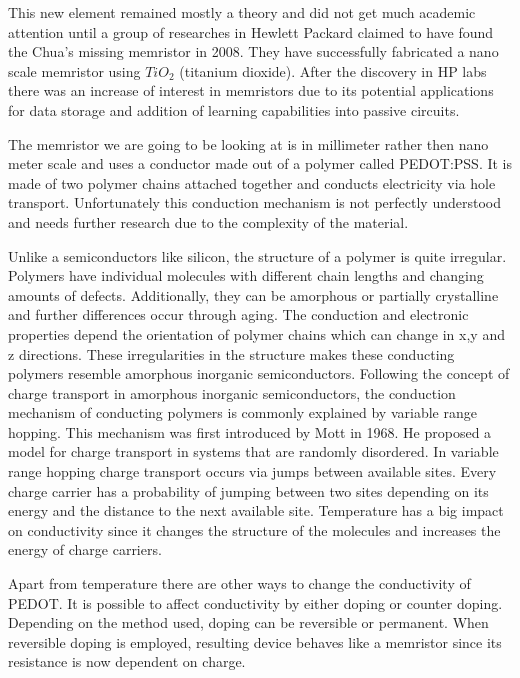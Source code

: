 This new element remained mostly a theory and did not get much academic attention until a group of researches in Hewlett Packard claimed to have found the Chua's missing memristor in 2008. They have successfully fabricated a nano scale memristor using $TiO_2$ (titanium dioxide). After the discovery in HP labs there was an increase of interest in memristors due to its potential applications for data storage and addition of learning capabilities into passive circuits. 

The memristor we are going to be looking at is in millimeter rather then nano meter scale and uses a conductor made out of a polymer called PEDOT:PSS. It is made of two polymer chains attached together and conducts electricity via hole transport. Unfortunately this conduction mechanism is not perfectly understood and needs further research due to the complexity of the material.

Unlike a semiconductors like silicon, the structure of a polymer is quite irregular. Polymers have individual molecules with different chain lengths and changing amounts of defects.
Additionally, they can be amorphous or partially crystalline and further differences occur through aging. The conduction and electronic properties depend the orientation of polymer chains which can change in x,y and z directions. These irregularities in the structure makes these conducting polymers resemble amorphous inorganic semiconductors. Following the concept of charge transport in amorphous inorganic semiconductors, the conduction mechanism of conducting polymers is commonly explained by variable range hopping. This mechanism was first introduced by Mott in 1968. He proposed a model for charge transport in systems that are randomly disordered. In variable range hopping charge transport occurs via jumps between available sites. Every charge carrier has a probability of jumping between two sites depending on its energy and the distance to the next available site. Temperature has a big impact on conductivity since it changes the structure of the molecules and increases the energy of charge carriers.

Apart from temperature there are other ways to change the conductivity of PEDOT. It is possible to affect conductivity by either doping or counter doping. Depending on the method used, doping can be reversible or permanent. When reversible doping is employed, resulting device behaves like a memristor since its resistance is now dependent on charge. 


